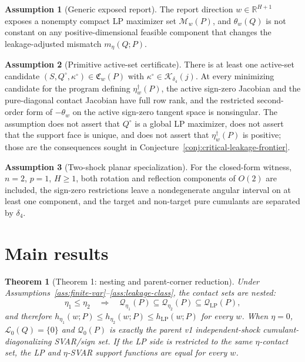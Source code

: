 \documentclass[11pt]{article}
\newcommand{\R}{\mathbb{R}}
\theoremstyle{definition}
\newtheorem{assumption}{Assumption}
\theoremstyle{plain}
\newtheorem{theorem}{Theorem}
\theoremstyle{remark}
\begin{document}
\begin{assumption}[Generic exposed report]\label{ass:generic-exposed}
The report direction \(w\in\R^{H+1}\) exposes a nonempty compact LP maximizer set \(\mathcal M_w(P)\), and \(\theta_w(Q)\) is not constant on any positive-dimensional feasible component that changes the leakage-adjusted mismatch \(m_\eta(Q;P)\).
\end{assumption}

\begin{assumption}[Primitive active-set certificate]\label{ass:primitive-rank}
There is at least one active-set candidate \((S,Q^\circ,\kappa^\circ)\in\mathfrak C_w(P)\) with \(\kappa^\circ\in\mathcal K_{\delta_4}(j)\).  At every minimizing candidate for the program defining \(\eta_w^\dagger(P)\), the active sign-zero Jacobian and the pure-diagonal contact Jacobian have full row rank, and the restricted second-order form of \(-\theta_w\) on the active sign-zero tangent space is nonsingular.  The assumption does not assert that \(Q^\circ\) is a global LP maximizer, does not assert that the support face is unique, and does not assert that \(\eta_w^\dagger(P)\) is positive; those are the consequences sought in Conjecture~\ref{conj:critical-leakage-frontier}.
\end{assumption}

\begin{assumption}[Two-shock planar specialization]\label{ass:two-shock}
For the closed-form witness, \(n=2\), \(p=1\), \(H\ge1\), both rotation and reflection components of \(O(2)\) are included, the sign-zero restrictions leave a nondegenerate angular interval on at least one component, and the target and non-target pure cumulants are separated by \(\delta_4\).
\end{assumption}

\section{Main results}
\begin{theorem}[Theorem 1: nesting and parent-corner reduction]\label{thm:parent-corner}
Under Assumptions~\ref{ass:finite-var}--\ref{ass:leakage-class}, the contact sets are nested:
\[
\eta_1\le\eta_2\quad\Longrightarrow\quad
\mathcal Q_{\eta_1}(P)\subseteq \mathcal Q_{\eta_2}(P)\subseteq\mathcal Q_{\mathrm{LP}}(P),
\]
and therefore \(h_{\eta_1}(w;P)\le h_{\eta_2}(w;P)\le h_{\mathrm{LP}}(w;P)\) for every \(w\).  When \(\eta=0\), \(\mathcal L_0(Q)=\{0\}\) and \(\mathcal Q_0(P)\) is exactly the parent v1 independent-shock cumulant-diagonalizing SVAR/sign set.  If the LP side is restricted to the same \(\eta\)-contact set, the LP and \(\eta\)-SVAR support functions are equal for every \(w\).
\end{theorem}
\end{document}
